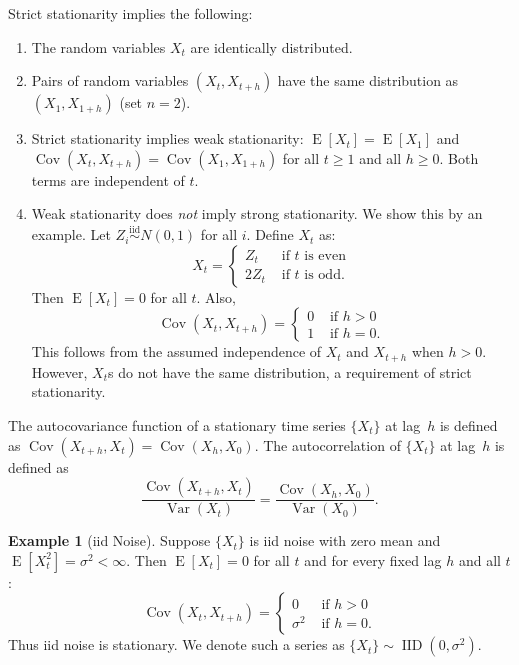 \documentclass[11pt,a4]{article}
\DeclareMathOperator{\cov}{Cov}
\DeclareMathOperator{\E}{E}
\DeclareMathOperator{\var}{Var}
\DeclareMathOperator{\IID}{IID}
\newcommand{\iid}{\ensuremath{\stackrel{\text{iid}}{\sim}}}
\theoremstyle{definition}
\newtheorem{example}{Example}
\begin{document}
Strict stationarity implies the following:
\begin{enumerate}
\item The random variables $X_t$ are identically distributed.
	
	\item Pairs of random variables $(X_t, X_{t + h})$ have the same
distribution as $(X_1, X_{1 + h})$ (set $n = 2$).
	
	\item Strict stationarity implies weak stationarity: $\E[X_t] =
\E[X_1]$ and $\cov(X_t, X_{t + h}) = \cov(X_1, X_{1 + h})$ for all $t \geq 1$
and all $h \geq 0$. Both terms are independent of $t$.
	
	\item Weak stationarity does \emph{not} imply strong stationarity. We
show this by an example. Let $Z_i \iid N(0, 1)$ for all $i$. Define $X_t$ as:
\[ X_t = \left \{ \begin{array}{ll} Z_t   & \text{ if $t$ is even}\\ 
                                    2 Z_t & \text{ if $t$ is odd}.   
                  \end{array}	
         \right . 
\] 
Then $\E[X_t] = 0$ for all $t$. Also, 
\[
    \cov(X_t, X_{t + h}) = \left \{ 
                                \begin{array}{ll}
                                    0 & \text{ if } h > 0 \\
                                    1 & \text{ if } h = 0.
                                \end{array}
                           \right . 
\]
This follows from the assumed independence of $X_t$ and $X_{t + h}$ when $h > 0$. 
However, $X_t$s do not have the same distribution, a requirement of 
strict stationarity.
\end{enumerate}

The autocovariance function of a stationary time series $\{ X_t \}$ at lag~$h$
is defined as $\cov(X_{t + h}, X_{t}) = \cov(X_{h}, X_{0})$. The autocorrelation
of $\{ X_t \}$ at lag~$h$ is defined as 
\[
	\frac{ \cov(X_{t + h}, X_t) }{ \var(X_t) } = 
	\frac{ \cov( X_h, X_0 )}{ \var(X_0) }.
\]   

\begin{example}[iid Noise]
Suppose $\{ X_t \}$ is iid noise with zero mean and 
$\E [X_t^2] = \sigma^2 < \infty$. Then $\E [X_t] = 0$ for all $t$ and for every
fixed lag $h$ and all $t$:
\[\cov(X_t, X_{t + h}) = \left \{ 
                                \begin{array}{ll}
                                    0        & \text{ if } h > 0 \\
                                    \sigma^2 & \text{ if } h = 0.
                                \end{array}
                          \right . 
\]
Thus iid noise is stationary. We denote such a series as 
$\{ X_t \} \sim \IID (0, \sigma^2)$.
\end{example}
\end{document}

